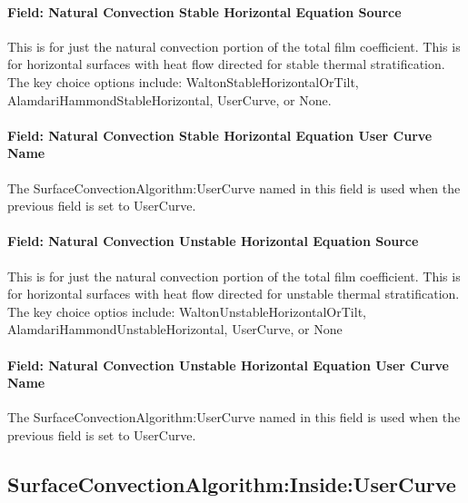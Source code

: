 \paragraph{Field: Natural Convection Stable Horizontal Equation Source}\label{field-natural-convection-stable-horizontal-equation-source}

This is for just the natural convection portion of the total film coefficient. This is for horizontal surfaces with heat flow directed for stable thermal stratification. The key choice options include: WaltonStableHorizontalOrTilt, AlamdariHammondStableHorizontal, UserCurve, or None.

\paragraph{Field: Natural Convection Stable Horizontal Equation User Curve Name}\label{field-natural-convection-stable-horizontal-equation-user-curve-name}

The SurfaceConvectionAlgorithm:UserCurve named in this field is used when the previous field is set to UserCurve.

\paragraph{Field: Natural Convection Unstable Horizontal Equation Source}\label{field-natural-convection-unstable-horizontal-equation-source}

This is for just the natural convection portion of the total film coefficient. This is for horizontal surfaces with heat flow directed for unstable thermal stratification. The key choice optios include: WaltonUnstableHorizontalOrTilt, AlamdariHammondUnstableHorizontal, UserCurve, or None

\paragraph{Field: Natural Convection Unstable Horizontal Equation User Curve Name}\label{field-natural-convection-unstable-horizontal-equation-user-curve-name}

The SurfaceConvectionAlgorithm:UserCurve named in this field is used when the previous field is set to UserCurve.

\subsection{SurfaceConvectionAlgorithm:Inside:UserCurve}\label{surfaceconvectionalgorithminsideusercurve}

